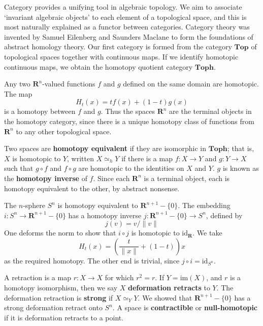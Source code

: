 Category provides a unifying tool in algebraic topology. We aim to associate `invariant algebraic objects' to each element of a topological space, and this is most naturally explained as a functor between categories. Category theory was invented by Samuel Eilenberg and Saunders Maclane to form the foundations of abstract homology theory. Our first category is formed from the category $\textbf{Top}$ of topological spaces together with continuous maps. If we identify homotopic continuous maps, we obtain the homotopy quotient category $\textbf{Toph}$.

\begin{example}
    Any two $\mathbf{R}^n$-valued functions $f$ and $g$ defined on the same domain are homotopic. The map
    \[ H_t(x) = t f(x) + (1 - t) g(x) \]
    is a homotopy between $f$ and $g$. Thus the spaces $\mathbf{R}^n$ are the terminal objects in the homotopy category, since there is a unique homotopy class of functions from $\mathbf{R}^n$ to any other topological space.
\end{example}

Two spaces are {\bf homotopy equivalent} if they are isomorphic in $\textbf{Toph}$; that is, $X$ is homotopic to $Y$, written $X \simeq_h Y$ if there is a map $f:X \to Y$ and $g: Y \to X$ such that $g \circ f$ and $f \circ g$ are homotopic to the identities on $X$ and $Y$. $g$ is known as the {\bf homotopy inverse} of $f$. Since each $\mathbf{R}^n$ is a terminal object, each is homotopy equivalent to the other, by abstract nonsense.

\begin{example}
    The $n$-sphere $S^n$ is homotopy equivalent to $\mathbf{R}^{n+1} - \{ 0 \}$. The embedding $i: S^n \to \mathbf{R}^{n+1} - \{ 0 \}$ has a homotopy inverse $j: \mathbf{R}^{n+1} - \{ 0 \} \to S^n$, defined by
    \[ j(v) = v/\|v\| \]
    One deforms the norm to show that $i \circ j$ is homotopic to $\text{id}_{\mathbf{R}}$. We take
    \[ H_t(x) = \left( \frac{t}{\| x \|} + (1 - t) \right) x \]
    as the required homotopy. The other end is trivial, since $j \circ i = \text{id}_{S^n}$.
\end{example}

A retraction is a map $r:X \to X$ for which $r^2 = r$. If $Y = \text{im}(X)$, and $r$ is a homotopy isomorphism, then we say $X$ {\bf deformation retracts} to $Y$. The deformation retraction is {\bf strong} if $X \simeq_Y Y$. We showed that $\mathbf{R}^{n+1} - \{ 0 \}$ has a strong deformation retract onto $S^n$. A space is {\bf contractible} or {\bf null-homotopic} if it is deformation retracts to a point.

